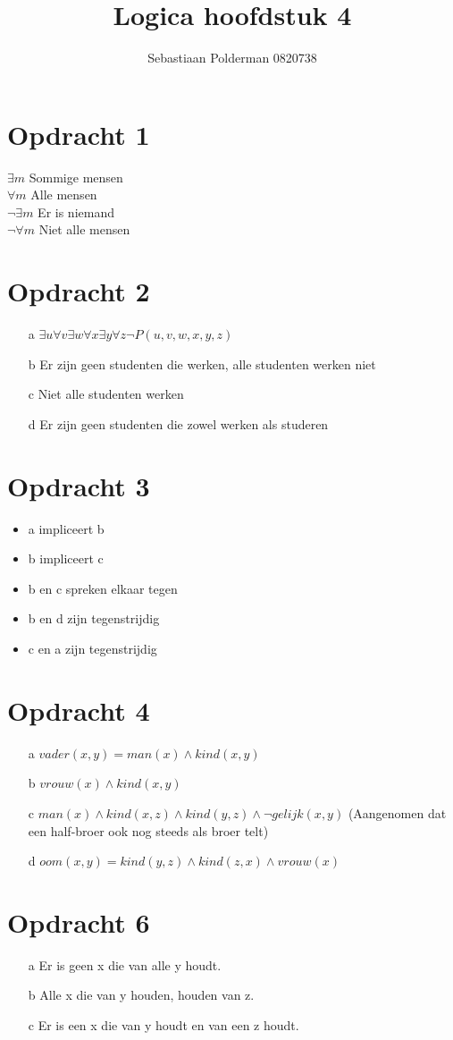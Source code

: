 \documentclass{artikel1}
\author{Sebastiaan Polderman 0820738}
\title{Logica hoofdstuk 4}
\begin{document}
\maketitle

\section{Opdracht 1}
$\exists m$ Sommige mensen\\
$\forall m$ Alle mensen\\
$\neg\exists m$ Er is niemand\\
$\neg\forall m$ Niet alle mensen\\
\section{Opdracht 2}
\begin{itemize}
\item[a] $\exists u \forall v \exists w \forall x \exists y \forall z \neg P (u,v,w,x,y,z)$
\item[b] Er zijn geen studenten die werken, alle studenten werken niet
\item[c] Niet alle studenten werken
\item[d] Er zijn geen studenten die zowel werken als studeren
\end{itemize}
\section{Opdracht 3}
\begin{itemize}
\item a impliceert b
\item b impliceert c
\item b en c spreken elkaar tegen
\item b en d zijn tegenstrijdig
\item c en a zijn tegenstrijdig
\end{itemize}
\section{Opdracht 4}
\begin{itemize}
\item[a]$vader(x,y) = man(x) \wedge kind(x,y)$
\item[b]$vrouw(x) \wedge kind(x,y)$
\item[c]$man(x) \wedge kind(x,z) \wedge kind(y,z) \wedge \neg gelijk(x,y)$ (Aangenomen dat een half-broer ook nog steeds als broer telt)
\item[d]$oom(x,y) = kind(y,z) \wedge kind(z,x) \wedge vrouw(x)$
\end{itemize}
\section{Opdracht 6}
\begin{itemize}
\item[a] Er is geen x die van alle y houdt.
\item[b] Alle x die van y houden, houden van z.
\item[c] Er is een x die van y houdt en van een z houdt.
\end{itemize}
\end{document}
